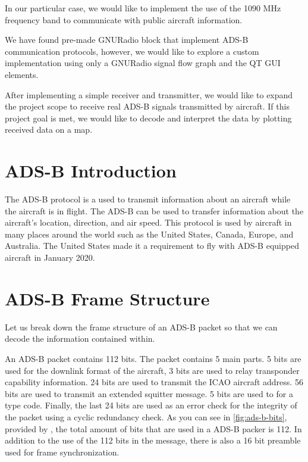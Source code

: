 \documentclass[conference]{IEEEtran}
\begin{document}
In our particular case, we would like to implement the use of the 1090 MHz frequency band to communicate with public aircraft information.

We have found pre-made GNURadio block that implement ADS-B communication protocols, however, we would like to explore a custom implementation using only a GNURadio signal flow graph and the QT GUI elements.

After implementing a simple receiver and transmitter, we would like to expand the project scope to receive real ADS-B signals transmitted by aircraft. If this project goal is met, we would like to decode and interpret the data by plotting received data on a map.



\section{ADS-B Introduction}
The ADS-B protocol is a used to transmit information about an aircraft while the aircraft is in flight. 
The ADS-B can be used to transfer information about the aircraft's location, direction, and air speed. 
This protocol is used by aircraft in many places around the world such as the United States, Canada, Europe, and Australia. 
The United States made it a requirement to fly with ADS-B equipped aircraft in January 2020. 

\section{ADS-B Frame Structure}
Let us break down the frame structure of an ADS-B packet so that we can decode the information contained within. 

An ADS-B packet contains 112 bits. The packet contains 5 main parts. 5 bits are used for the downlink format of the aircraft, 3 bits are used to relay transponder capability information. 24 bits are used to transmit the ICAO aircraft address. 56 bits are used to transmit an extended squitter message. 5 bits are used to for a type code. Finally, the last 24 bits are used as an error check for the integrity of the packet using a cyclic redundancy check. As you can see in \autoref{fig:ads-b-bits}, provided by \cite{sun1090mhz}, the total amount of bits that are used in a ADS-B packer is 112. In addition to the use of the 112 bits in the message, there is also a 16 bit preamble used for frame synchronization.
\end{document}
